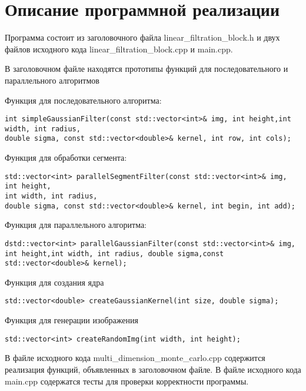 \documentclass{report}
\begin{document}
\section*{Описание программной реализации}
Программа состоит из заголовочного файла linear\_filtration\_block.h и двух файлов исходного кода linear\_filtration\_block.cpp и main.cpp.
\par В заголовочном файле находятся прототипы функций для последовательного и параллельного алгоритмов
\par Функция для последовательного алгоритма:
\begin{lstlisting}
int simpleGaussianFilter(const std::vector<int>& img, int height,int width, int radius,
double sigma, const std::vector<double>& kernel, int row, int cols);
\end{lstlisting}
\par Функция для обработки сегмента:
\begin{lstlisting}
std::vector<int> parallelSegmentFilter(const std::vector<int>& img, int height,
int width, int radius,
double sigma, const std::vector<double>& kernel, int begin, int add);
\end{lstlisting}
\par Функция для параллельного
алгоритма:
\begin{lstlisting}
dstd::vector<int> parallelGaussianFilter(const std::vector<int>& img, int height,int width, int radius, double sigma,const std::vector<double>& kernel);
\end{lstlisting}
\par Функция для создания ядра
\begin{lstlisting}
std::vector<double> createGaussianKernel(int size, double sigma);
\end{lstlisting}

\par Функция для генерации изображения
\begin{lstlisting}
std::vector<int> createRandomImg(int width, int height);
\end{lstlisting}

\par В файле исходного кода multi\_dimension\_monte\_carlo.cpp содержится реализация функций, объявленных в заголовочном файле. В файле исходного кода main.cpp содержатся тесты для проверки корректности программы.
\newpage
\end{document}
